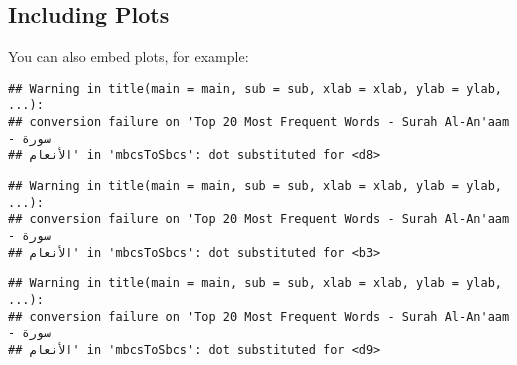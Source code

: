 \documentclass[]{article}
\newenvironment{Shaded}{\begin{snugshade}}{\end{snugshade}}
\newcommand{\DataTypeTok}[1]{\textcolor[rgb]{0.13,0.29,0.53}{#1}}
\newcommand{\DecValTok}[1]{\textcolor[rgb]{0.00,0.00,0.81}{#1}}
\newcommand{\FloatTok}[1]{\textcolor[rgb]{0.00,0.00,0.81}{#1}}
\newcommand{\KeywordTok}[1]{\textcolor[rgb]{0.13,0.29,0.53}{\textbf{#1}}}
\newcommand{\NormalTok}[1]{#1}
\newcommand{\OperatorTok}[1]{\textcolor[rgb]{0.81,0.36,0.00}{\textbf{#1}}}
\newcommand{\StringTok}[1]{\textcolor[rgb]{0.31,0.60,0.02}{#1}}
\begin{document}
\hypertarget{including-plots}{%
\subsection{Including Plots}\label{including-plots}}

You can also embed plots, for example:

\begin{Shaded}
\end{Shaded}

\begin{verbatim}
## Warning in title(main = main, sub = sub, xlab = xlab, ylab = ylab, ...):
## conversion failure on 'Top 20 Most Frequent Words - Surah Al-An'aam - سورة
## الأنعام' in 'mbcsToSbcs': dot substituted for <d8>
\end{verbatim}

\begin{verbatim}
## Warning in title(main = main, sub = sub, xlab = xlab, ylab = ylab, ...):
## conversion failure on 'Top 20 Most Frequent Words - Surah Al-An'aam - سورة
## الأنعام' in 'mbcsToSbcs': dot substituted for <b3>
\end{verbatim}

\begin{verbatim}
## Warning in title(main = main, sub = sub, xlab = xlab, ylab = ylab, ...):
## conversion failure on 'Top 20 Most Frequent Words - Surah Al-An'aam - سورة
## الأنعام' in 'mbcsToSbcs': dot substituted for <d9>
\end{verbatim}
\end{document}
